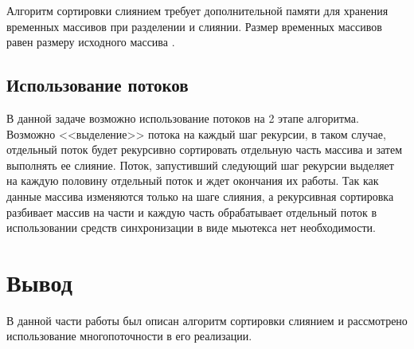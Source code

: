 Алгоритм сортировки слиянием требует дополнительной памяти для хранения временных массивов при разделении и слиянии. Размер временных массивов равен размеру исходного массива \cite{merge-sort}.


\subsection{Использование потоков}
В данной задаче возможно использование потоков на 2 этапе алгоритма. Возможно <<выделение>> потока на каждый шаг рекурсии, в таком случае, 
отдельный поток будет рекурсивно сортировать отдельную часть массива  и затем выполнять ее слияние. Поток, запустивший следующий шаг рекурсии 
выделяет на каждую половину отдельный поток и ждет окончания их работы. Так как данные массива изменяются только на шаге слияния, а рекурсивная сортировка
разбивает массив на части и каждую часть обрабатывает отдельный поток в использовании средств синхронизации в виде мьютекса нет необходимости.

\section*{Вывод}
В данной части работы был описан алгоритм сортировки слиянием и рассмотрено использование многопоточности в его реализации.






